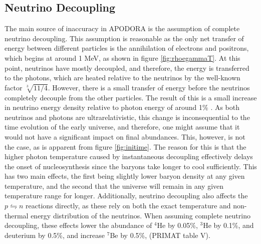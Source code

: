 \subsection{Neutrino Decoupling}
\label{sec:decoupling}
The main source of inaccuracy in APODORA is the assumption of complete neutrino decoupling. This assumption is reasonable as the only net transfer of energy between different particles is the annihilation of electrons and positrons, which begins at around 1 MeV, as shown in figure \ref{fig:rhoegammaT}. At this point, neutrinos have mostly decoupled, and therefore, the energy is transferred to the photons, which are heated relative to the neutrinos by the well-known factor $\sqrt[3]{11/4}$. However, there is a small transfer of energy before the neutrinos completely decouple from the other particles. The result of this is a small increase in neutrino energy density relative to photon energy of around 1\% \cite{Hannestad:1995rs}. As both neutrinos and photons are ultrarelativistic, this change is inconsequential to the time evolution of the early universe, and therefore, one might assume that it would not have a significant impact on final abundances. This, however, is not the case, as is apparent from figure \ref{fig:initime}. The reason for this is that the higher photon temperature caused by instantaneous decoupling effectively delays the onset of nucleosynthesis since the baryons take longer to cool sufficiently. This has two main effects, the first being slightly lower baryon density at any given temperature, and the second that the universe will remain in any given temperature range for longer. Additionally, neutrino decoupling also affects the $p\leftrightharpoons n$ reactions directly, as these rely on both the exact temperature and non-thermal energy distribution of the neutrinos. When assuming complete neutrino decoupling, these effects lower the abundance of ${}^4$He by 0.05\%, ${}^3$He by 0.1\%, and deuterium by 0.5\%, and increase ${}^7$Be by 0.5\%, (PRIMAT table V\cite{PRIMAT}). 

